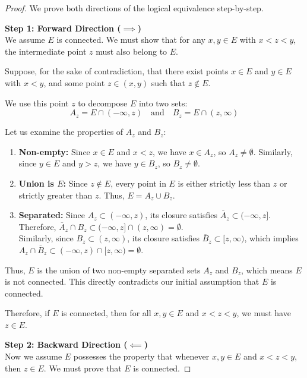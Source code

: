 \documentclass{article}
\theoremstyle{mythm}
\begin{document}
\begin{proof}
We prove both directions of the logical equivalence step-by-step.

\textbf{Step 1: Forward Direction ($\implies$)} \\
We assume $E$ is connected. We must show that for any $x, y \in E$ with $x < z < y$, the intermediate point $z$ must also belong to $E$.

Suppose, for the sake of contradiction, that there exist points $x \in E$ and $y \in E$ with $x < y$, and some point $z \in (x, y)$ such that $z \notin E$.

We use this point $z$ to decompose $E$ into two sets:
\[ A_z = E \cap (-\infty, z) \quad \text{and} \quad B_z = E \cap (z, \infty) \]

Let us examine the properties of $A_z$ and $B_z$:
\begin{enumerate}[label=(\roman*)]
    \item \textbf{Non-empty:} Since $x \in E$ and $x < z$, we have $x \in A_z$, so $A_z \neq \emptyset$. Similarly, since $y \in E$ and $y > z$, we have $y \in B_z$, so $B_z \neq \emptyset$.
    \item \textbf{Union is $E$:} Since $z \notin E$, every point in $E$ is either strictly less than $z$ or strictly greater than $z$. Thus, $E = A_z \cup B_z$.
    \item \textbf{Separated:} Since $A_z \subset (-\infty, z)$, its closure satisfies $\overline{A}_z \subset (-\infty, z]$. Therefore, $\overline{A}_z \cap B_z \subset (-\infty, z] \cap (z, \infty) = \emptyset$. \\
    Similarly, since $B_z \subset (z, \infty)$, its closure satisfies $\overline{B}_z \subset [z, \infty)$, which implies $A_z \cap \overline{B}_z \subset (-\infty, z) \cap [z, \infty) = \emptyset$.
\end{enumerate}

Thus, $E$ is the union of two non-empty separated sets $A_z$ and $B_z$, which means $E$ is not connected. This directly contradicts our initial assumption that $E$ is connected.

Therefore, if $E$ is connected, then for all $x, y \in E$ and $x < z < y$, we must have $z \in E$.

\vspace{0.5em}

\textbf{Step 2: Backward Direction ($\impliedby$)} \\
Now we assume $E$ possesses the property that whenever $x, y \in E$ and $x < z < y$, then $z \in E$. We must prove that $E$ is connected.


\end{proof}
\end{document}
